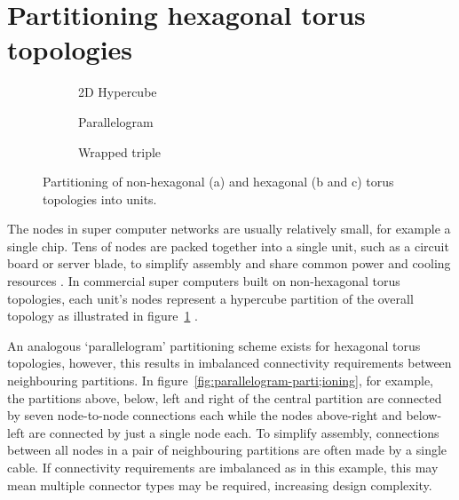 	\section{Partitioning hexagonal torus topologies}
		
		\begin{figure}
			\center
			\begin{subfigure}[b]{0.32\textwidth}
				\center
				\caption{2D Hypercube}
				\label{fig:hypercube-partitioning}
			\end{subfigure}
			\begin{subfigure}[b]{0.32\textwidth}
				\center
				\caption{Parallelogram}
				\label{fig:parallelogram-partitioning}
			\end{subfigure}
			\begin{subfigure}[b]{0.32\textwidth}
				\center
				\caption{Wrapped triple}
				\label{fig:wrapped-triple-partitioning}
			\end{subfigure}
			
			\caption{Partitioning of non-hexagonal (a) and hexagonal (b and c) torus
			topologies into units.}
			\label{fig:partitioning-options}
		\end{figure}
		
		The nodes in super computer networks are usually relatively small, for
		example a single chip. Tens of nodes are packed together into a single
		unit, such as a circuit board or server blade, to simplify assembly and
		share common power and cooling resources \cite{gilge14,ajima12}. In
		commercial super computers built on non-hexagonal torus topologies, each
		unit's nodes represent a hypercube partition of the overall topology as
		illustrated in figure~\ref{fig:hypercube-partitioning}
		\cite{chen11,ajima12}.
		
		An analogous `parallelogram' partitioning scheme exists for hexagonal torus
		topologies, however, this results in imbalanced connectivity requirements
		between neighbouring partitions. In
		figure~\ref{fig:parallelogram-parti;ioning}, for example, the partitions
		above, below, left and right of the central partition are connected by
		seven node-to-node connections each while the nodes above-right and
		below-left are connected by just a single node each. To simplify assembly,
		connections between all nodes in a pair of neighbouring partitions are
		often made by a single cable. If connectivity requirements are imbalanced
		as in this example, this may mean multiple connector types may be required,
		increasing design complexity.
		
